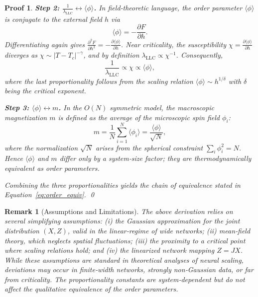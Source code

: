 \documentclass[11pt, a4paper]{article}
\theoremstyle{plain}
\newtheorem*{remark}{Remark}
\newtheorem*{pf}{Proof}
\begin{document}
\begin{pf}
\textbf{Step 2: $\frac{1}{\lambda_{\text{LLC}}} \leftrightarrow \langle\phi\rangle$.}
In field‑theoretic language, the order parameter $\langle\phi\rangle$ is conjugate to the external field $h$ via
\begin{equation}
\langle\phi\rangle = -\frac{\partial F}{\partial h}.
\end{equation}
Differentiating again gives $\frac{\partial^2 F}{\partial h^2} = -\frac{\partial\langle\phi\rangle}{\partial h}$. Near criticality, the susceptibility $\chi = \frac{\partial\langle\phi\rangle}{\partial h}$ diverges as $\chi \sim |T-T_c|^{-\gamma}$, and by definition $\lambda_{\text{LLC}} \propto \chi^{-1}$. Consequently,
\begin{equation}
\frac{1}{\lambda_{\text{LLC}}} \propto \chi \propto \langle\phi\rangle,
\end{equation}
where the last proportionality follows from the scaling relation $\langle\phi\rangle \sim h^{1/\delta}$ with $\delta$ being the critical exponent.

\textbf{Step 3: $\langle\phi\rangle \leftrightarrow m$.}
In the $O(N)$ symmetric model, the macroscopic magnetization $m$ is defined as the average of the microscopic spin field $\phi_i$:
\begin{equation}
m = \frac{1}{N}\sum_{i=1}^N \langle\phi_i\rangle = \frac{\langle\phi\rangle}{\sqrt{N}},
\end{equation}
where the normalization $\sqrt{N}$ arises from the spherical constraint $\sum_i \phi_i^2 = N$. Hence $\langle\phi\rangle$ and $m$ differ only by a system‑size factor; they are thermodynamically equivalent as order parameters.

Combining the three proportionalities yields the chain of equivalence stated in Equation~\eqref{eq:order_equiv}.
\qed
\end{pf}

\begin{remark}[Assumptions and Limitations]
The above derivation relies on several simplifying assumptions: (i) the Gaussian approximation for the joint distribution $(X,Z)$, valid in the linear‑regime of wide networks; (ii) mean‑field theory, which neglects spatial fluctuations; (iii) the proximity to a critical point where scaling relations hold; and (iv) the linearized network mapping $Z=JX$. While these assumptions are standard in theoretical analyses of neural scaling, deviations may occur in finite‑width networks, strongly non‑Gaussian data, or far from criticality. The proportionality constants are system‑dependent but do not affect the qualitative equivalence of the order parameters.
\end{remark}
\end{document}
